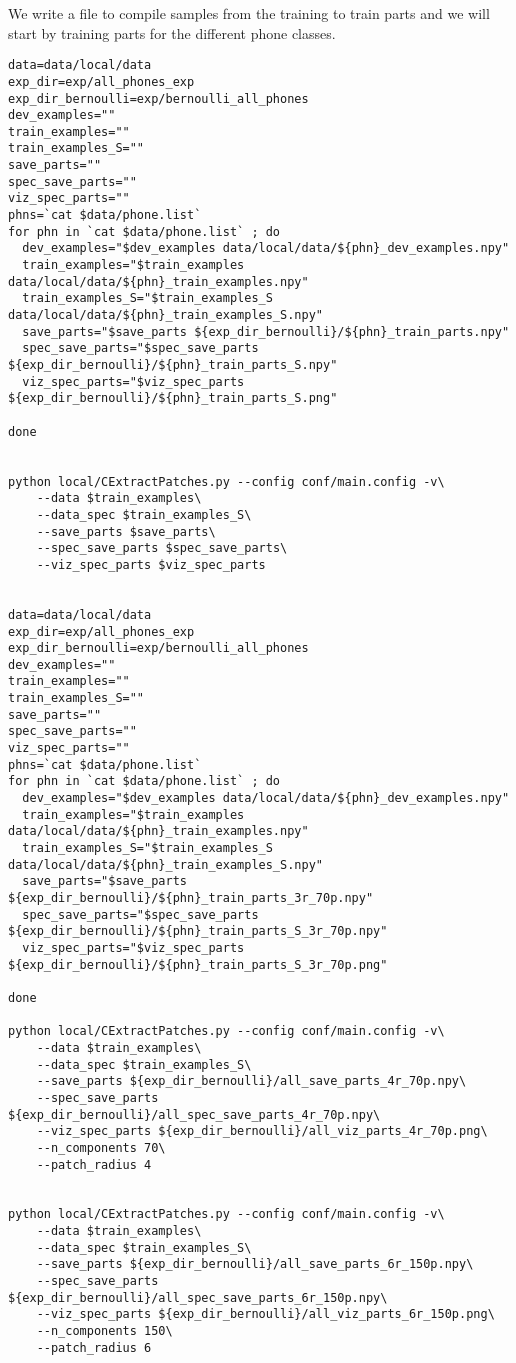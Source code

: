 \documentclass{article}
\begin{document}
We write a file to compile samples from the training to train
parts and we will start by training parts for the different phone
classes.
\begin{verbatim}
data=data/local/data
exp_dir=exp/all_phones_exp
exp_dir_bernoulli=exp/bernoulli_all_phones
dev_examples=""
train_examples=""
train_examples_S=""
save_parts=""
spec_save_parts=""
viz_spec_parts=""
phns=`cat $data/phone.list`
for phn in `cat $data/phone.list` ; do
  dev_examples="$dev_examples data/local/data/${phn}_dev_examples.npy"
  train_examples="$train_examples data/local/data/${phn}_train_examples.npy"
  train_examples_S="$train_examples_S data/local/data/${phn}_train_examples_S.npy"
  save_parts="$save_parts ${exp_dir_bernoulli}/${phn}_train_parts.npy"
  spec_save_parts="$spec_save_parts ${exp_dir_bernoulli}/${phn}_train_parts_S.npy"
  viz_spec_parts="$viz_spec_parts ${exp_dir_bernoulli}/${phn}_train_parts_S.png"

done


python local/CExtractPatches.py --config conf/main.config -v\
    --data $train_examples\
    --data_spec $train_examples_S\
    --save_parts $save_parts\
    --spec_save_parts $spec_save_parts\
    --viz_spec_parts $viz_spec_parts


data=data/local/data
exp_dir=exp/all_phones_exp
exp_dir_bernoulli=exp/bernoulli_all_phones
dev_examples=""
train_examples=""
train_examples_S=""
save_parts=""
spec_save_parts=""
viz_spec_parts=""
phns=`cat $data/phone.list`
for phn in `cat $data/phone.list` ; do
  dev_examples="$dev_examples data/local/data/${phn}_dev_examples.npy"
  train_examples="$train_examples data/local/data/${phn}_train_examples.npy"
  train_examples_S="$train_examples_S data/local/data/${phn}_train_examples_S.npy"
  save_parts="$save_parts ${exp_dir_bernoulli}/${phn}_train_parts_3r_70p.npy"
  spec_save_parts="$spec_save_parts ${exp_dir_bernoulli}/${phn}_train_parts_S_3r_70p.npy"
  viz_spec_parts="$viz_spec_parts ${exp_dir_bernoulli}/${phn}_train_parts_S_3r_70p.png"

done

python local/CExtractPatches.py --config conf/main.config -v\
    --data $train_examples\
    --data_spec $train_examples_S\
    --save_parts ${exp_dir_bernoulli}/all_save_parts_4r_70p.npy\
    --spec_save_parts ${exp_dir_bernoulli}/all_spec_save_parts_4r_70p.npy\
    --viz_spec_parts ${exp_dir_bernoulli}/all_viz_parts_4r_70p.png\
    --n_components 70\
    --patch_radius 4


python local/CExtractPatches.py --config conf/main.config -v\
    --data $train_examples\
    --data_spec $train_examples_S\
    --save_parts ${exp_dir_bernoulli}/all_save_parts_6r_150p.npy\
    --spec_save_parts ${exp_dir_bernoulli}/all_spec_save_parts_6r_150p.npy\
    --viz_spec_parts ${exp_dir_bernoulli}/all_viz_parts_6r_150p.png\
    --n_components 150\
    --patch_radius 6



\end{verbatim}
\end{document}
